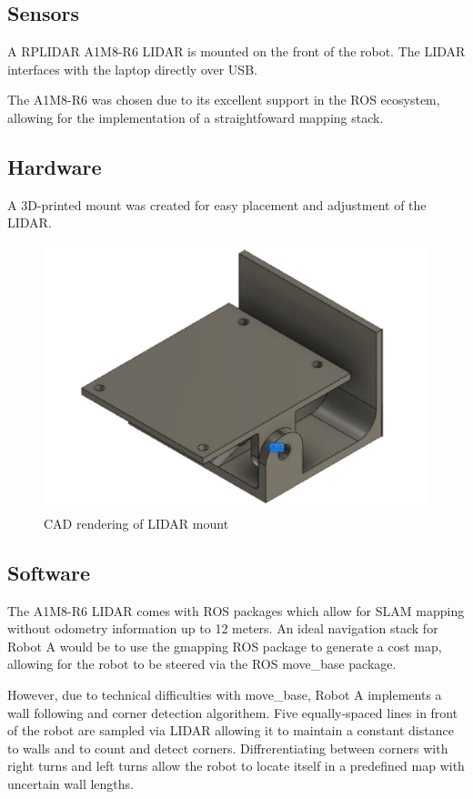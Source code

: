 \documentclass[11pt]{article}
\begin{document}
	\subsection{Sensors}
	A RPLIDAR A1M8-R6 LIDAR is mounted on the front of the robot. The LIDAR interfaces with the laptop directly over USB. \newline
	
	The A1M8-R6 was chosen due to its excellent support in the ROS ecosystem, allowing for the implementation of a straightfoward mapping stack. 
	
	\subsection{Hardware}
	A 3D-printed mount was created for easy placement and adjustment of the LIDAR.
	
	\begin{figure}[h]
		\centering
		\includegraphics[scale=0.6]{lidar_mount}
		\caption{CAD rendering of LIDAR mount}
	\end{figure}
	
	\subsection{Software}
	The A1M8-R6 LIDAR comes with ROS packages which allow for SLAM mapping without odometry information up to 12 meters. An ideal navigation stack for Robot A would be to use the gmapping ROS package to generate a cost map, allowing for the robot to be steered via the ROS move\_base package. \newline
	
	However, due to technical difficulties with move\_base, Robot A implements a wall following and corner detection algorithem. Five equally-spaced lines in front of the robot are sampled via LIDAR allowing it to maintain a constant distance to walls and to count and detect corners. Diffrerentiating between corners with right turns and left turns allow the robot to locate itself in a predefined map with uncertain wall lengths.\newline
	
\end{document}

